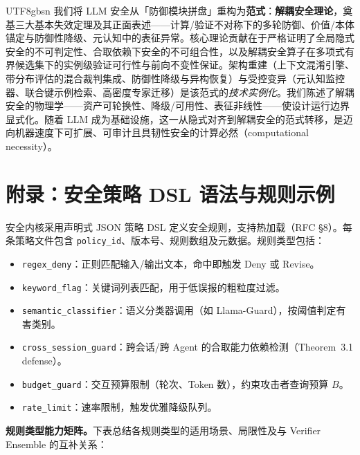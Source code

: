 \documentclass[letterpaper,twocolumn,10pt]{article}
\begin{document}
\begin{CJK}{UTF8}{gbsn}
我们将 LLM 安全从「防御模块拼盘」重构为\textbf{范式}：\textbf{解耦安全理论}，奠基三大基本失效定理及其正面表述——计算/验证不对称下的多轮防御、价值/本体锚定与防御性降级、元认知中的表征异常。核心理论贡献在于严格证明了全局隐式安全的不可判定性、合取依赖下安全的不可组合性，以及解耦安全算子在多项式有界候选集下的实例级验证可行性与前向不变性保证。架构重建（上下文混淆引擎、带分布评估的混合裁判集成、防御性降级与异构恢复）与受控变异（元认知监控器、联合键示例检索、高密度专家迁移）是该范式的\emph{技术实例化}。我们陈述了解耦安全的物理学——资产可轮换性、降级/可用性、表征非线性——使设计运行边界显式化。随着 LLM 成为基础设施，这一从隐式对齐到解耦安全的范式转移，是迈向机器速度下可扩展、可审计且具韧性安全的计算必然（computational necessity）。

\appendix

\section{附录：安全策略 DSL 语法与规则示例}
\label{sec:appendix-dsl}

安全内核采用声明式 JSON 策略 DSL 定义安全规则，支持热加载（RFC \S 8）。每条策略文件包含 \texttt{policy\_id}、版本号、规则数组及元数据。规则类型包括：

\begin{itemize}
\item \texttt{regex\_deny}：正则匹配输入/输出文本，命中即触发 Deny 或 Revise。
\item \texttt{keyword\_flag}：关键词列表匹配，用于低误报的粗粒度过滤。
\item \texttt{semantic\_classifier}：语义分类器调用（如 Llama-Guard），按阈值判定有害类别。
\item \texttt{cross\_session\_guard}：跨会话/跨 Agent 的合取能力依赖检测（Theorem~3.1 defense）。
\item \texttt{budget\_guard}：交互预算限制（轮次、Token 数），约束攻击者查询预算 $B$。
\item \texttt{rate\_limit}：速率限制，触发优雅降级队列。
\end{itemize}

\noindent\textbf{规则类型能力矩阵。}下表总结各规则类型的适用场景、局限性及与 Verifier Ensemble 的互补关系：


\end{CJK}
\end{document}
